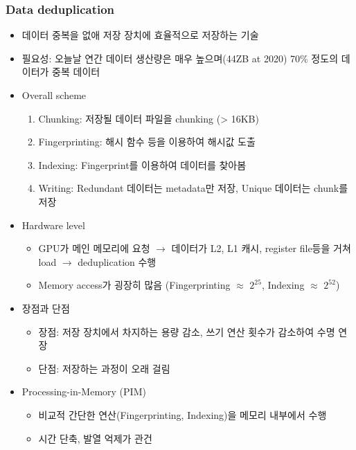 \subsubsection*{Data deduplication}
\begin{itemize}
    \item 데이터 중복을 없애 저장 장치에 효율적으로 저장하는 기술
    \item 필요성: 오늘날 연간 데이터 생산량은 매우 높으며(44ZB at 2020) 70\% 정도의 데이터가 중복 데이터
    \item Overall scheme
    \begin{enumerate}
        \item Chunking: 저장될 데이터 파일을 chunking (\textgreater{} 16KB)
        \item Fingerprinting: 해시 함수 등을 이용하여 해시값 도출
        \item Indexing: Fingerprint를 이용하여 데이터를 찾아봄
        \item Writing: Redundant 데이터는 metadata만 저장, Unique 데이터는 chunk를 저장
    \end{enumerate}
    \item Hardware level
    \begin{itemize}
        \item GPU가 메인 메모리에 요청 $\rightarrow$ 데이터가 L2, L1 캐시, register file등을 거쳐 load $\rightarrow$ deduplication 수행
        \item Memory access가 굉장히 많음 (Fingerprinting $\approx$ $2^{25}$, Indexing $\approx$ $2^{52}$)
    \end{itemize}
    \item 장점과 단점
    \begin{itemize}
        \item 장점: 저장 장치에서 차지하는 용량 감소, 쓰기 연산 횟수가 감소하여 수명 연장
        \item 단점: 저장하는 과정이 오래 걸림
    \end{itemize}
    \item Processing-in-Memory (PIM)
    \begin{itemize}
        \item 비교적 간단한 연산(Fingerprinting, Indexing)을 메모리 내부에서 수행
        \item 시간 단축, 발열 억제가 관건
    \end{itemize}
\end{itemize}

